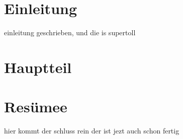 \documentclass[11pt,a4paper]{article}
\begin{document}
\section{Einleitung}

einleitung geschrieben, und die is supertoll

\section{Hauptteil}

\section{Resümee}

hier kommt der schluss rein der ist jezt auch schon fertig
\end{document}

